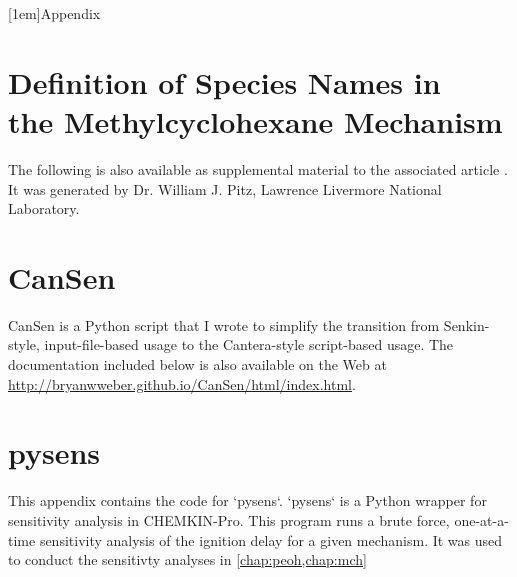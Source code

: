 \documentclass[12pt,letterpaper,oneside,draft]{book}
\begin{document}
\begin{appendices}
\makeatletter
\addappheadtotoc
{}
[1em]{}{Appendix \thecontentslabel\quad}{}{\contentspage}
%
\makeatother
{}
\chapter[Definition of Species Names in the Methylcyclohexane Mechanism]%
{Definition of Species Names in\\the Methylcyclohexane Mechanism}
\label{app:mch-dict}
The following is also available as supplemental material to the associated article \cite{Weber2014}.
It was generated by Dr. William J. Pitz, Lawrence Livermore National Laboratory.



\chapter{CanSen}
\label{app:cansen}
CanSen is a Python script that I wrote to simplify the transition from
Senkin-style, input-file-based usage to the Cantera-style script-based usage.
The documentation included below is also available on the Web at
\url{http://bryanwweber.github.io/CanSen/html/index.html}.



\chapter{pysens}
\begin{singlespace}
{\setlength{\parindent}{0pt}
\DefineShortVerb[commandchars=\\\{\}]{\`}
This appendix contains the code for `pysens`. `pysens` is a Python wrapper
for sensitivity analysis in CHEMKIN-Pro. This program runs a brute
force, one-at-a-time sensitivity analysis of the ignition delay for a
given mechanism. It was used to conduct the sensitivty analyses in
\cref{chap:peoh,chap:mch}

}
\end{singlespace}
\end{appendices}
\end{document}
